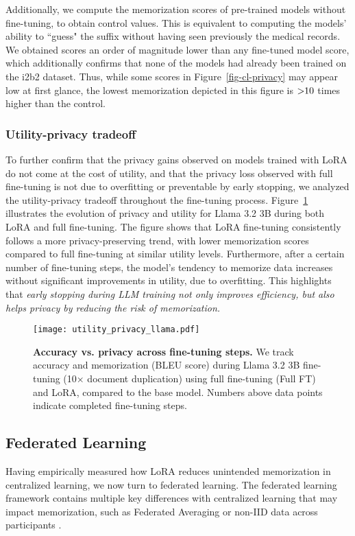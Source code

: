 Additionally, we compute the memorization scores of pre-trained models without fine-tuning, to obtain control values. This is equivalent to computing the models' ability to ``guess" the suffix without having seen previously the medical records. We obtained scores an order of magnitude lower than any fine-tuned model score, which additionally confirms that none of the models had already been trained on the i2b2 dataset. Thus, while some scores in Figure~\ref{fig-cl-privacy} may appear low at first glance, the lowest memorization depicted in this figure is $>\hspace{-0.3em}10$ times higher than the control.

\subsubsection{Utility-privacy tradeoff}
To further confirm that the privacy gains observed on models trained with LoRA do not come at the cost of utility, and that the privacy loss observed with full fine-tuning is not due to overfitting or preventable by early stopping, we analyzed the utility-privacy tradeoff throughout the fine-tuning process. Figure~\ref{fig-tradeoff} illustrates the evolution of privacy and utility for Llama 3.2 3B during both LoRA and full fine-tuning. The figure shows that LoRA fine-tuning consistently follows a more privacy-preserving trend, with lower memorization scores compared to full fine-tuning at similar utility levels. Furthermore, after a certain number of fine-tuning steps, the model's tendency to memorize data increases without significant improvements in utility, due to overfitting. This highlights that \textit{early stopping during LLM training not only improves efficiency, but also helps privacy by reducing the risk of memorization.}
 
\begin{figure}[ht]
\vskip 0.2in
\begin{center}
\centerline{\texttt{[image: utility\_privacy\_llama.pdf]}}
\caption{\textbf{Accuracy vs. privacy across fine-tuning steps.} We track accuracy and memorization (BLEU score) during Llama 3.2 3B fine-tuning (10× document duplication) using full fine-tuning (Full FT) and LoRA, compared to the base model. Numbers above data points indicate completed fine-tuning steps.}
\label{fig-tradeoff}
\end{center}
\vskip -0.2in
\end{figure}

\subsection{Federated Learning}
\label{fl}
Having empirically measured how LoRA reduces unintended memorization in centralized learning, we now turn to federated learning. 
The federated learning framework contains multiple key differences with centralized learning that may impact memorization, such as Federated Averaging or non-IID data across participants \citep{thakkar2020understanding}.

